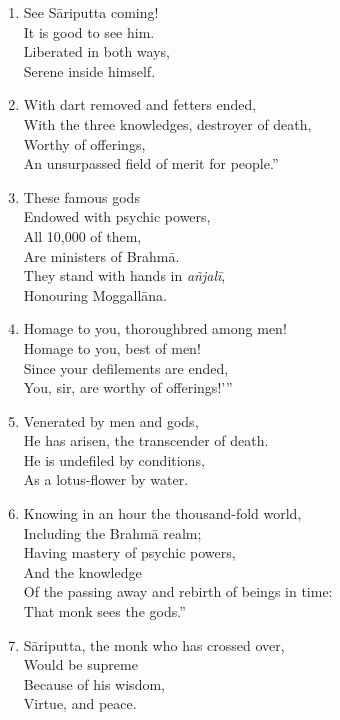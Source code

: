 \documentclass[10pt, openany]{book}
\newcommand*{\vleftofline}[1]{\leavevmode\llap{#1}}
\begin{document}
\begin{enumerate}
\item \vleftofline{“}See Sāriputta coming!\\
It is good to see him.\\
Liberated in both ways,\\
Serene inside himself.

\item With dart removed and fetters ended,\\
With the three knowledges, destroyer of death,\\
Worthy of offerings,\\
An unsurpassed field of merit for people.”

\item These famous gods\\
Endowed with psychic powers,\\
All 10,000 of them,\\
Are ministers of Brahmā.\\
They stand with hands in \emph{añjalī},\\
Honouring Moggallāna.

\item \vleftofline{‘}Homage to you, thoroughbred among men!\\
Homage to you, best of men!\\
Since your defilements are ended,\\
You, sir, are worthy of offerings!’”

\item \vleftofline{“}Venerated by men and gods,\\
He has arisen, the transcender of death.\\
He is undefiled by conditions,\\
As a lotus-flower by water.

\item Knowing in an hour the thousand-fold world,\\
Including the Brahmā realm;\\
Having mastery of psychic powers, \\
And the knowledge \\
Of the passing away and rebirth of beings in time:\\
That monk sees the gods.”

\item \vleftofline{“}Sāriputta, the monk who has crossed over,\\
Would be supreme\\
Because of his wisdom, \\
Virtue, and peace.


\end{enumerate}
\end{document}
